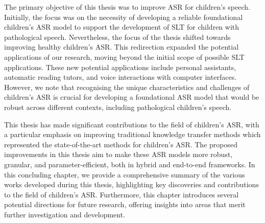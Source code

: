 \label{chap:8}
\cleardoublepage

The primary objective of this thesis was to improve \ac{ASR} for children's speech. Initially, the focus was on the necessity of developing a reliable foundational children's \ac{ASR} model to support the development of \ac{SLT} for children with pathological speech. Nevertheless, the focus of the thesis shifted towards improving healthy children's \ac{ASR}. This redirection expanded the potential applications of our research, moving beyond the initial scope of possible \ac{SLT} applications. These new potential applications include personal assistants, automatic reading tutors, and voice interactions with computer interfaces. However, we note that recognising the unique characteristics and challenges of children's \ac{ASR} is crucial for developing a foundational \ac{ASR} model that would be robust across different contexts, including pathological children's speech.

This thesis has made significant contributions to the field of children's \ac{ASR}, with a particular emphasis on improving traditional knowledge transfer methods which represented the state-of-the-art methods for children's \ac{ASR}. The proposed improvements in this thesis aim to make these \ac{ASR} models more robust, granular, and parameter-efficient, both in hybrid and end-to-end frameworks. In this concluding chapter, we provide a comprehensive summary of the various works developed during this thesis, highlighting key discoveries and contributions to the field of children's \ac{ASR}. Furthermore, this chapter introduces several potential directions for future research, offering insights into areas that merit further investigation and development.

